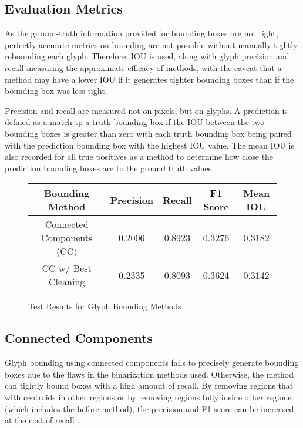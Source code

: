\subsection{Evaluation Metrics}

As the ground-truth information provided for bounding boxes are not tight, perfectly accurate metrics on bounding are not possible without manually tightly rebounding each glyph. Therefore, IOU is used, along with glyph precision and recall measuring the approximate efficacy of methods, with the caveat that a method may have a lower IOU if it generates tighter bounding boxes than if the bounding box was less tight.

Precision and recall are measured not on pixels, but on glyphs. A prediction is defined as a match tp a truth bounding box if the IOU between the two bounding boxes is greater than zero with each truth bounding box being paired with the prediction bounding box with the highest IOU value. The mean IOU is also recorded for all true positives as a method to determine how close the prediction bounding boxes are to the ground truth values.

\begin{figure}[H]
    \caption{Test Results for Glyph Bounding Methods}
    \label{fig:boundingEval}
    \centering
    \begin{tabular}{ | c | c | c | c | c | }
        \hline
        Bounding Method & Precision & Recall & F1 Score & Mean IOU \\
        \hline
        Connected Components (CC) & 0.2006 & 0.8923 & 0.3276 & 0.3182 \\
        CC w/ Best Cleaning & 0.2335 & 0.8093 & 0.3624 & 0.3142 \\
        \hline
    \end{tabular}
\end{figure}

\subsection{Connected Components}

Glyph bounding using connected components fails to precisely generate bounding boxes due to the flaws in the binarization methods used. Otherwise, the method can tightly bound boxes with a high amount of recall. By removing regions that with centroids in other regions or by removing regions fully inside other regions (which includes the before method), the precision and F1 score can be increased, at the cost of recall .

